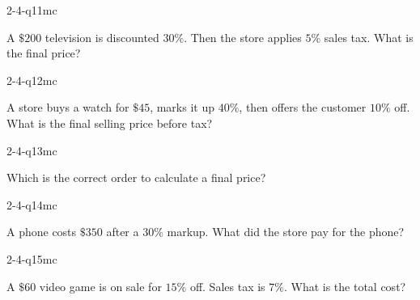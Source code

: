 \begin{practiceQuestion}{2-4-q11}{mc}
\begin{questionText}
A $\$200$ television is discounted $30\%$. Then the store applies $5\%$ sales tax. What is the final price?
\end{questionText}
\end{practiceQuestion}

\begin{practiceQuestion}{2-4-q12}{mc}
\begin{questionText}
A store buys a watch for $\$45$, marks it up $40\%$, then offers the customer $10\%$ off. What is the final selling price before tax?
\end{questionText}
\end{practiceQuestion}

\begin{practiceQuestion}{2-4-q13}{mc}
\begin{questionText}
Which is the correct order to calculate a final price?
\end{questionText}
\end{practiceQuestion}

\begin{practiceQuestion}{2-4-q14}{mc}
\begin{questionText}
A phone costs $\$350$ after a $30\%$ markup. What did the store pay for the phone?
\end{questionText}
\end{practiceQuestion}

\begin{practiceQuestion}{2-4-q15}{mc}
\begin{questionText}
A $\$60$ video game is on sale for $15\%$ off. Sales tax is $7\%$. What is the total cost?
\end{questionText}
\end{practiceQuestion}

